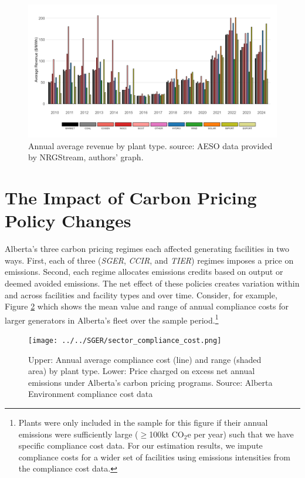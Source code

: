 \documentclass[12pt]{article}
\begin{document}
\begin{figure}[t]%
	\centering \vspace{-.25cm} \includegraphics[width=6.5in]{../images/price_capture.png}
\vspace{-0.75cm}	\caption{Annual average revenue by plant type. source: AESO data provided by NRGStream, authors' graph.}
\label{fig:capture_prices}
\end{figure}


\section{The Impact of Carbon Pricing Policy Changes}

Alberta's three carbon pricing regimes each affected generating facilities in two ways. First, each of three (\emph{SGER}, \emph{CCIR}, and \emph{TIER}) regimes imposes a price on emissions. Second, each regime allocates emissions credits based on output or deemed avoided emissions. The net effect of these policies creates variation within and across facilities and facility types and over time.  Consider, for example, Figure \ref{fig:sector_compliance_cost} which shows the mean value and range of annual compliance costs for larger generators in Alberta's fleet over the sample period.\footnote{Plants were only included in the sample for this figure if their annual emissions were sufficiently large ($\geq$100kt CO$_2$e per year) such that we have specific compliance cost data. For our estimation results, we impute compliance costs for a wider set of facilities using emissions intensities from the compliance cost data.}

\begin{figure}[t]%
	\centering \vspace{-.25cm} \texttt{[image: ../../SGER/sector\_compliance\_cost.png]}
\vspace{-0.75cm}	\caption{Upper: Annual average compliance cost (line) and range (shaded area) by plant type. Lower: Price charged on excess net annual emissions under Alberta's carbon pricing programs. Source: Alberta Environment compliance cost data}
\label{fig:sector_compliance_cost}
\end{figure}
\end{document}
